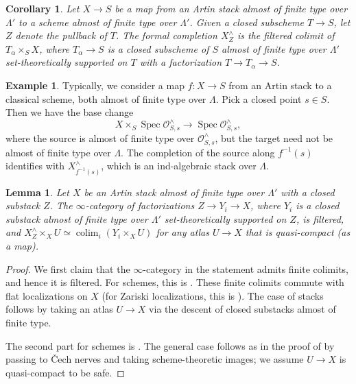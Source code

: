 \documentclass{amsart}
\newtheorem{lemma}[theorem]{Lemma}
\newtheorem{corollary}[theorem]{Corollary}
\theoremstyle{definition}
\newtheorem{example}[theorem]{Example}
\theoremstyle{remark}
\numberwithin{equation}{section}
\DeclareMathOperator{\Spec}{Spec}
\DeclareMathOperator{\colim}{colim}
\begin{document}
\begin{corollary}
Let $X\to S$ be a map from an Artin stack almost of finite type over $\Lambda'$ to a scheme almost of finite type over $\Lambda'$. Given a closed subscheme $T\to S$, let $Z$ denote the pullback of $T$. The formal completion $X^\wedge_Z$ is the filtered colimit of $T_\alpha\times_{S} X$, where $T_\alpha \to S$ is a closed subscheme of $S$ almost of finite type over $\Lambda'$ set-theoretically supported on $T$ with a factorization $T\to T_\alpha\to S$.  
\end{corollary}

\begin{example}
Typically, we consider a map $f\colon X\to S$ from an Artin stack to a classical scheme, both almost of finite type over $\Lambda$. Pick a closed point $s\in S$. Then we have the base change
\[
X\times_S \Spec \mathcal{O}_{S,s}^\wedge \to \Spec \mathcal{O}_{S,s}^\wedge,  
\]
where the source is almost of finite type over $\mathcal{O}_{S,s}^\wedge$, but the target need not be almost of finite type over $\Lambda$. 
The completion of the source along $f^{-1}(s)$ identifies with $X^\wedge_{f^{-1}(s)}$, which is an ind-algebraic stack over $\Lambda$. 
\end{example}

\begin{lemma}
Let $X$ be an Artin stack almost of finite type over $\Lambda'$ with a closed substack $Z$. The $\infty$-category of factorizations $Z\to Y_i\to X$, where $Y_i$ is a closed substack almost of finite type over $\Lambda'$ set-theoretically supported on $Z$, is filtered, and $X^\wedge_Z\times_X U\simeq \colim_i (Y_i\times_X U)$ for any atlas $U\to X$ that is quasi-compact (as a map). 
\end{lemma}



\begin{proof}
We first claim that the $\infty$-category in the statement admits finite colimits, and hence it is filtered. For schemes, this is \cite[Proposition 3.1.3(i)]{GRInd}. These finite colimits commute with flat localizations on $X$ (for Zariski localizations, this is \cite[Proposition 3.1.3(ii)]{GRInd}). The case of stacks follows by taking an atlas $U\to X$ via the descent of closed substacks almost of finite type. 

The second part for schemes is \cite[Proposition 6.5.5]{GRInd}. The general case follows as in the proof of \cite[Proposition 2.2.21]{chendhillon} by passing to \v{C}ech nerves and taking scheme-theoretic images; we assume $U\to X$ is quasi-compact to be safe. 
\end{proof}
\end{document}
